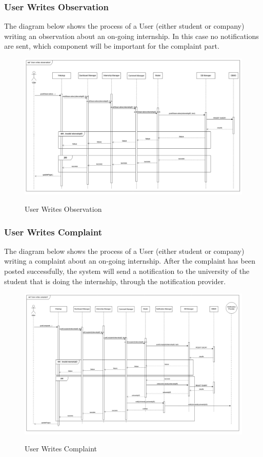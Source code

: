 \documentclass[a4paper,12pt]{article}
\begin{document}
\subsubsection*{User Writes Observation}
The diagram below shows the process of a User (either student or company) writing an observation about an on-going internship. In this case no notifications are sent, which component will be important for the complaint part.
\begin{figure}[H]
\centering
\includegraphics[scale = 0.4]{DD_figures/RuntimeView/UserWritesObservationRV.png}\\
\caption{User Writes Observation}
\end{figure}
\newpage

\subsubsection*{User Writes Complaint}
The diagram below shows the process of a User (either student or company) writing a complaint about an on-going internship. After the complaint has been posted successfully, the system will send a notification to the university of the student that is doing the internship, through the notification provider.
\begin{figure}[H]
\centering
\includegraphics[scale = 0.4]{DD_figures/RuntimeView/UserWritesComplaintRV.png}\\
\caption{User Writes Complaint}
\end{figure}
\newpage
\end{document}
